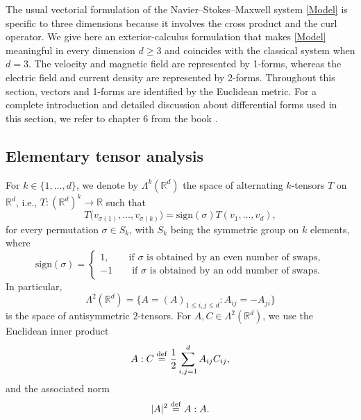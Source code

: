\documentclass[11pt, leqno, a4paper,]{amsart}
\theoremstyle{remark}
\numberwithin{equation}{section}
\newcommand*{\bydef}{\overset{\rm def}{=}}
\begin{document}
The usual vectorial formulation of the Navier--Stokes--Maxwell system \eqref{Model} is specific to three dimensions because it involves the cross product and the curl operator. We give here an exterior-calculus formulation that makes \eqref{Model} meaningful in every dimension $d\geq 3$ and coincides with the classical system when $d=3$. The velocity and magnetic field are represented by 1-forms, whereas the electric field and current density are represented by 2-forms. Throughout this section, vectors and 1-forms are identified by the Euclidean metric. For a complete introduction and detailed discussion about differential forms used in this section, we refer to chapter 6 from the book \cite{AMR-book88}.

 

\subsection{Elementary tensor analysis}  For $k\in \{ 1,\dots , d\}$, we denote by $\Lambda^k(\mathbb R^d)$ the space of alternating $k$-tensors $T$ on $\mathbb R^d$, i.e.,  $T: (\mathbb R^d)^k \to \mathbb R$ 
such that 
\begin{equation*}
	T\big ( v_{\sigma(1)}, \dots,  v_{\sigma(k)} \big ) = \text{sign}(\sigma) T ( v_1, \dots,  v_d)  ,
\end{equation*}
for every permutation $\sigma\in S_k$, with $S_k$ being the symmetric group on $k$ elements, where 
\begin{equation*}
	\text{sign}(\sigma)= \begin{cases}
		1, \qquad \text{if } \sigma \text{ is obtained by an even number of swaps},
		\\
		-1 \qquad \text{if } \sigma \text{ is obtained by an odd number of swaps}.
	\end{cases}
\end{equation*}
In particular, 
\begin{equation*}
	\Lambda^2 (\mathbb R^d)= \{A= (A)_{1\leq i,j\leq d} : A_{ij}=- A_{ji} \} 
\end{equation*}
is the space of antisymmetric $2$-tensors. For $A,C\in \Lambda^2 (\mathbb R^d)$, we use the Euclidean inner product
\begin{equation*}
	A:C \bydef \frac{1}{2} \sum_{i,j=1}^d A_{ij} C_{ij},
\end{equation*}
and the associated norm 
\begin{equation*}
	|A|^2 \bydef A:A.
\end{equation*}
\end{document}
